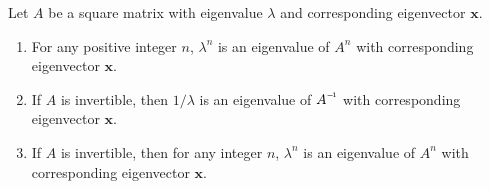 \begin{theorem}
	Let $ A $ be a square matrix with eigenvalue $ \lambda $ and corresponding eigenvector $ \textbf{x} $.
	\begin{enumerate}
		\item For any positive integer $ n $, $ \lambda^{n} $ is an eigenvalue of $ A^{n} $ with corresponding eigenvector $ \textbf{x} $.
		\item If $ A $ is invertible, then $ 1/\lambda $ is an eigenvalue of $ \inv{A} $ with corresponding eigenvector $ \textbf{x} $. 
		\item If $ A $ is invertible, then for any integer $ n $, $ \lambda^{n} $ is an eigenvalue of $ A^{n} $ with corresponding eigenvector $ \textbf{x} $.
	\end{enumerate}
\end{theorem}
